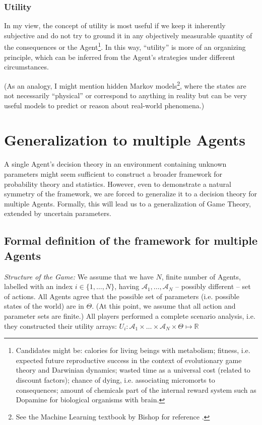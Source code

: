 \documentclass{article}
\begin{document}
\subsubsection*{Utility}

In my view, the concept of utility is most useful if we keep it inherently subjective and do not try to ground it in any objectively measurable quantity of the consequences or the Agent\footnote{Candidates might be: calories \cite{paper:DietSelectionAndOptimization,book:NewEcology} for living beings with metabolism; fitness, i.e. expected future reproductive success in the context of evolutionary game theory and Darwinian dynamics; wasted time as a universal cost (related to discount factors); chance of dying, i.e. associating micromorts \cite{paper:Micromorts,book:Micromorts} to consequences; amount of chemicals part of the internal reward system such as Dopamine for biological organisms with brain.}.
In this way, ``utility'' is more of an organizing principle, which can be inferred from the Agent's strategies under different circumstances.

(As an analogy, I might mention hidden Markov models\footnote{See the Machine Learning textbook by Bishop for reference \cite{book:Bishop}.}, where the states are not necessarily ``physical'' or correspond to anything in reality but can be very useful models to predict or reason about real-world phenomena.)


\section*{Generalization to multiple Agents}

A single Agent's decision theory in an environment containing unknown parameters might seem sufficient to construct a broader framework for probability theory and statistics. However, even to demonstrate a natural symmetry of the framework, we are forced to generalize it to a decision theory for multiple Agents. Formally, this will lead us to a generalization of Game Theory, extended by uncertain parameters.

\subsection*{Formal definition of the framework for multiple Agents}

{\it Structure of the Game:}
We assume that we have $N$, finite number of Agents, labelled with an index $i \in \{1,\dots,N\}$, having $\mathcal{A}_1,\dots,\mathcal{A}_N$ -- possibly different -- set of actions.
All Agents agree that the possible set of parameters (i.e. possible states of the world) are in $\Theta$.
(At this point, we assume that all action and parameter sets are finite.)
All players performed a complete scenario analysis, i.e. they constructed their utility arrays:
$U_i : \mathcal{A}_1 \times \dots \times \mathcal{A}_N \times \Theta \mapsto \mathbb{R}$
\end{document}
